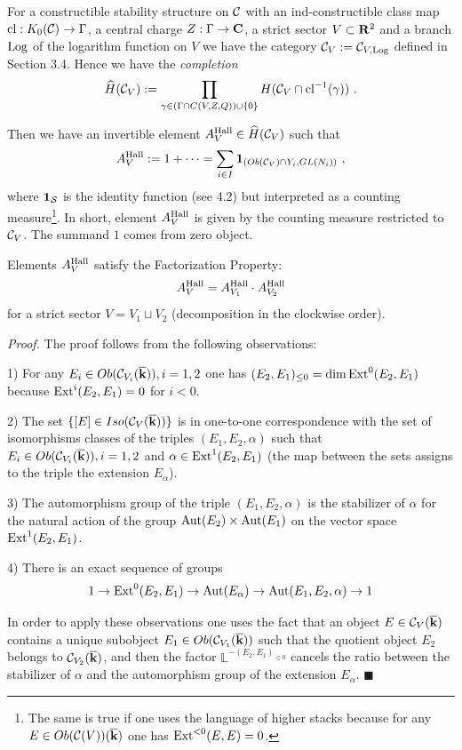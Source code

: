 \documentclass[12pt]{article}
\begin{document}
For a constructible stability structure on ${\mathcal C}$ with an ind-constructible class map $\operatorname{cl}:K_0({\mathcal C})\to \Gamma$, a central charge $Z:\Gamma\to {\bf C}$, a strict sector $V\subset {\bf R}^2$ and a branch $\operatorname{Log}$ of the logarithm function on $V$ we have the category ${\mathcal C}_V:={\mathcal C}_{V,\operatorname{Log}}$ defined in Section 3.4. Hence we have
the {\it completion} 
$$\widehat{H}({\mathcal C}_V):=\prod_{\gamma\in (\Gamma\cap C(V,Z,Q))\cup\{0\}}H({\mathcal C}_V\cap \operatorname{cl}^{-1}(\gamma))\,\,.$$

Then we have an invertible element $A_V^{\operatorname{Hall}}\in \widehat{H}({\mathcal C}_V)$ such that
$$A_V^{\operatorname{Hall}}:=1+\dots=\sum_{i\in I}  \mathbf{1}_{(Ob({\mathcal C}_V)\cap Y_i,GL(N_i))}\,\,,$$
where $\mathbf{1}_{\cal S}$ is the identity function (see 4.2) but interpreted as a counting measure\footnote{The same is true if one uses the language of higher stacks because for any $E\in Ob({\mathcal C}(V))({\overline{\bf k}})$ one has $\operatorname{Ext}^{<0}(E,E)=0$.}.
In short, element $A_V^{\operatorname{Hall}}$ is given by the counting measure restricted to
${\mathcal C}_V$. The summand $1$ comes from zero object.


\begin{prp} Elements $A_V^{\operatorname{Hall}}$ satisfy the Factorization Property:
$$A_{V}^{\operatorname{Hall}}=A_{V_1}^{\operatorname{Hall}}\cdot A_{V_2}^{\operatorname{Hall}}$$
for a strict sector $V=V_1\sqcup V_2$ (decomposition in the clockwise order).
\end{prp}


{\it Proof.} The proof follows from the following observations:

1) For any $E_i\in Ob({\mathcal C}_{V_i}({\overline{\bf k}})), i=1,2$ one has $(E_2,E_1)_{\le 0}=\dim\operatorname{Ext}^0(E_2,E_1)$ because $\operatorname{Ext}^i(E_2,E_1)=0$ for $i< 0$.

2) The set $\{[E]\in Iso({\mathcal C}_V({\overline{\bf k}}))\}$ is in one-to-one correspondence with the set of isomorphisms classes of the triples $(E_1,E_2,\alpha)$ such that $E_i\in Ob({\mathcal C}_{V_i}({\overline{\bf k}})), i=1,2$ and $\alpha\in \operatorname{Ext}^1(E_2,E_1)$ (the map between the sets assigns to the triple the extension $E_{\alpha}$).

3) The automorphism group of the triple $(E_1,E_2,\alpha)$ is the stabilizer of $\alpha$ for the natural action of the group $\operatorname{Aut}(E_2)\times \operatorname{Aut}(E_1)$ on the vector space $\operatorname{Ext}^1(E_2,E_1)$.


4) There is an exact sequence of groups
   $$1\to \operatorname{Ext}^0(E_2,E_1)\to \operatorname{Aut}(E_\alpha)\to\operatorname{Aut}( E_1,E_2,\alpha) \to 1   $$


In order to apply these observations one uses the fact that an object $E\in {\mathcal C}_V({\overline{\bf k}})$ contains a unique subobject
$E_1\in Ob({\mathcal C}_{V_1}({\overline{\bf k}}))$ such that the quotient object $E_2$ belongs to ${\mathcal C}_{V_2}({\overline{\bf k}})$, and
then the factor ${\mathbb L}^{-(E_2,E_1)_{\le 0}}$ cancels the ratio between the stabilizer of $\alpha$ and the automorphism group of 
the extension $E_\alpha$. $\blacksquare$
\end{document}
